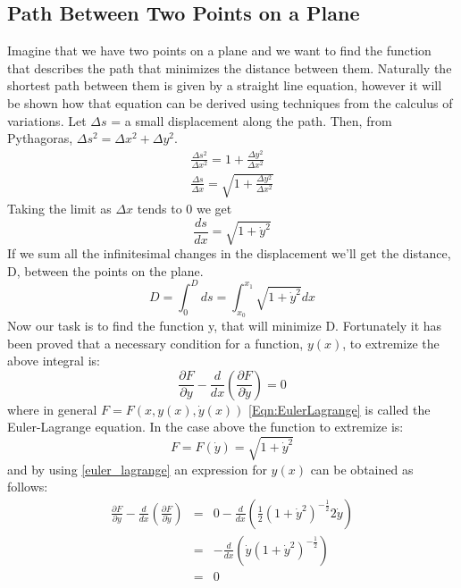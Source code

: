 \subsection{Path Between Two Points on a Plane}
\label{sec:PathBetweenTwoPointsOnAPlane}
Imagine that we have two points on a plane and we want to find the function that
describes the path that minimizes the distance between them. Naturally the
shortest path between them is given by a straight line equation, however it will
be shown how that equation can be derived using techniques from the calculus of
variations. Let $\Delta s$ = a small displacement along the path. Then, from
Pythagoras, $\Delta s^2 = \Delta x^2 + \Delta y^2$.
\begin{eqnarray*}
	\frac{\Delta s^2}{\Delta x^2} = 1 + \frac{\Delta y^2}{\Delta x^2}\\
	\frac{\Delta s}{\Delta x} = \sqrt{1 + \frac{\Delta y^2}{\Delta x^2}}
\end{eqnarray*}
Taking the limit as $\Delta x$ tends to $0$ we get
\begin{equation}
	\frac{ds}{dx} = \sqrt{1 + \dot{y}^2}
\end{equation}
If we sum all the infinitesimal changes in the displacement we'll get the
distance, D, between the points on the plane.
\begin{equation}
	\label{f_to_minimize}
	D = \int_{0}^{D} ds = \int_{x_0}^{x_1} \sqrt{1 + \dot{y}^2} dx
\end{equation}
Now our task is to find the function y, that will minimize D. Fortunately it has
been proved \cite[pg 37 - 39]{Goldstein} that a necessary condition for a function, $y(x)$, to extremize the
above integral is:
\begin{equation}
	\label{Eqn:EulerLagrange}
	\frac{\partial F}{\partial y} - \frac{d}{dx}\left(\frac{\partial F}{\partial \dot{y}}\right) = 0
\end{equation}
where in general $F = F(x,y(x),\dot{y}(x))$
\ref{Eqn:EulerLagrange} is called the Euler-Lagrange equation.
In the case above the function to extremize is:
\begin{equation}
F = F(\dot{y}) = \sqrt{1 + \dot{y}^2}
\end{equation}
and by using \ref{euler_lagrange} an expression for $y(x)$ can be obtained as
follows:
\begin{eqnarray*}
	\frac{\partial F}{\partial y} - \frac{d}{dx}\left(\frac{\partial F}{\partial \dot{y}}\right)
	&=& 0 - \frac{d}{dx}\left(\frac{1}{2}\left(1+\dot{y}^2\right)^{-\frac{1}{2}}2\dot{y}\right)\\
	&=& - \frac{d}{dx}\left(\dot{y}\left(1+\dot{y}^2\right)^{-\frac{1}{2}}\right)\\
	&=& 0
\end{eqnarray*}
